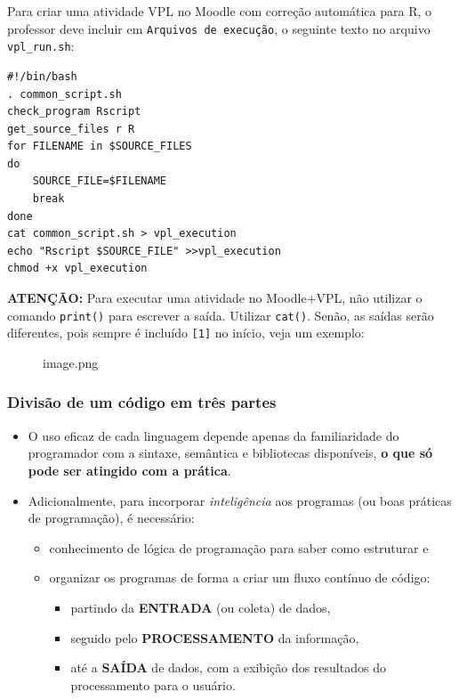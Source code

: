 \documentclass[12pt,a4paper]{article}
\providecommand{\tightlist}{%
      \setlength{\itemsep}{0pt}\setlength{\parskip}{0pt}}
\begin{document}
    Para criar uma atividade VPL no Moodle com correção automática para R, o
professor deve incluir em \texttt{Arquivos\ de\ execução}, o seguinte
texto no arquivo \texttt{vpl\_run.sh}:

\begin{verbatim}
#!/bin/bash
. common_script.sh
check_program Rscript
get_source_files r R
for FILENAME in $SOURCE_FILES
do
    SOURCE_FILE=$FILENAME
    break
done
cat common_script.sh > vpl_execution
echo "Rscript $SOURCE_FILE" >>vpl_execution
chmod +x vpl_execution
\end{verbatim}

    \textbf{ATENÇÃO:} Para executar uma atividade no Moodle+VPL, não
utilizar o comando \texttt{print()} para escrever a saída. Utilizar
\texttt{cat()}. Senão, as saídas serão diferentes, pois sempre é
incluído \texttt{{[}1{]}} no início, veja um exemplo:

    \begin{figure}
\centering
\caption{image.png}
\end{figure}

    \hypertarget{divisuxe3o-de-um-cuxf3digo-em-truxeas-partes}{%
\subsubsection{Divisão de um código em três
partes}\label{divisuxe3o-de-um-cuxf3digo-em-truxeas-partes}}

    \begin{itemize}
\item
  O uso eficaz de cada linguagem depende apenas da familiaridade do
  programador com a sintaxe, semântica e bibliotecas disponíveis,
  \textbf{o que só pode ser atingido com a prática}.
\item
  Adicionalmente, para incorporar \emph{inteligência} aos programas (ou
  boas práticas de programação), é necessário:

  \begin{itemize}
  \tightlist
  \item
    conhecimento de lógica de programação para saber como estruturar e
  \item
    organizar os programas de forma a criar um fluxo contínuo de código:

    \begin{itemize}
    \tightlist
    \item
      partindo da \textbf{ENTRADA} (ou coleta) de dados,
    \item
      seguido pelo \textbf{PROCESSAMENTO} da informação,
    \item
      até a \textbf{SAÍDA} de dados, com a exibição dos resultados do
      processamento para o usuário.
    \end{itemize}
  \end{itemize}
\end{itemize}
\end{document}
